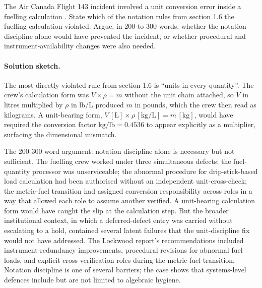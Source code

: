 \begin{exercise}
The Air Canada Flight 143 incident involved a unit conversion error
inside a fuelling calculation \cite{acc:lockwood-gimli1985}. State
which of the notation rules from section 1.6 the fuelling
calculation violated. Argue, in 200 to 300 words, whether the
notation discipline alone would have prevented the incident, or
whether procedural and instrument-availability changes were also
needed.

\paragraph{Solution sketch.}
The most directly violated rule from section 1.6 is ``units in every
quantity''. The crew's calculation form was $V \times \rho = m$
without the unit chain attached, so $V$ in litres multiplied by
$\rho$ in $\text{lb}/\text{L}$ produced $m$ in pounds, which the
crew then read as kilograms. A unit-bearing form, $V \,[\text{L}]
\times \rho \,[\text{kg}/\text{L}] = m \,[\text{kg}]$, would have
required the conversion factor $\text{kg}/\text{lb} = 0.4536$ to
appear explicitly as a multiplier, surfacing the dimensional
mismatch.

The 200-300 word argument: notation discipline alone is necessary
but not sufficient. The fuelling crew worked under three
simultaneous defects: the fuel-quantity processor was unserviceable;
the abnormal procedure for drip-stick-based load calculation had
been authorised without an independent unit-cross-check; the
metric-fuel transition had assigned conversion responsibility across
roles in a way that allowed each role to assume another verified.
A unit-bearing calculation form would have caught the slip at the
calculation step. But the broader institutional context, in which a
deferred-defect entry was carried without escalating to a hold,
contained several latent failures that the unit-discipline fix
would not have addressed. The Lockwood report's recommendations
included instrument-redundancy improvements, procedural revisions
for abnormal fuel loads, and explicit cross-verification roles
during the metric-fuel transition. Notation discipline is one of
several barriers; the case shows that systems-level defences
include but are not limited to algebraic hygiene.
\end{exercise}

